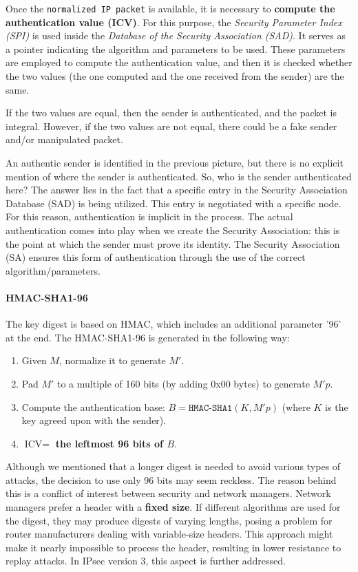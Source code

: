 Once the \texttt{normalized IP packet} is available, it is necessary to \textbf{compute the authentication value (ICV)}. For this purpose, the \textit{Security Parameter Index (SPI)} is used inside the \textit{Database of the Security Association (SAD)}. It serves as a pointer indicating the algorithm and parameters to be used. These parameters are employed to compute the authentication value, and then it is checked whether the two values (the one computed and the one received from the sender) are the same.

If the two values are equal, then the sender is authenticated, and the packet is integral. However, if the two values are not equal, there could be a fake sender and/or manipulated packet.

An authentic sender is identified in the previous picture, but there is no explicit mention of where the sender is authenticated. So, who is the sender authenticated here? The answer lies in the fact that a specific entry in the Security Association Database (SAD) is being utilized. This entry is negotiated with a specific node. For this reason, authentication is implicit in the process. The actual authentication comes into play when we create the Security Association: this is the point at which the sender must prove its identity. The Security Association (SA) ensures this form of authentication through the use of the correct algorithm/parameters.


\paragraph{HMAC-SHA1-96}
The key digest is based on HMAC, which includes an additional parameter '96' at the end. The HMAC-SHA1-96 is generated in the following way:

\begin{enumerate}
    \item Given $M$, normalize it to generate $M'$.
    \item Pad $M'$ to a multiple of 160 bits (by adding 0x00 bytes) to generate $M'p$.
    \item Compute the authentication base: $B = \texttt{HMAC-SHA1}(K, M'p)$ (where $K$ is the key agreed upon with the sender).
    \item $\text{ICV} = $ \textbf{the leftmost 96 bits of $B$}.
\end{enumerate}

Although we mentioned that a longer digest is needed to avoid various types of attacks, the decision to use only 96 bits may seem reckless. The reason behind this is a conflict of interest between security and network managers. Network managers prefer a header with a \textbf{fixed size}. If different algorithms are used for the digest, they may produce digests of varying lengths, posing a problem for router manufacturers dealing with variable-size headers. This approach might make it nearly impossible to process the header, resulting in lower resistance to replay attacks. In IPsec version 3, this aspect is further addressed.

